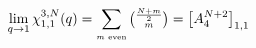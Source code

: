 \begin{equation}
\lim_{q\to 1} \chi_{1,1}^{3,N}(q)
=\sum_{\mbox{\tiny $m$ even}}\mbox{\small ${{N+m\over 2}\choose m}$}
=\big[A_4^{N+2}\big]_{1,1}
\end{equation}

